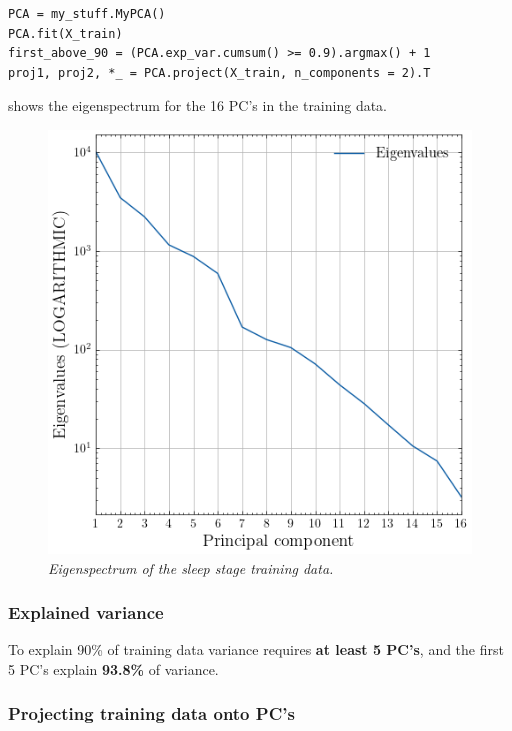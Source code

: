 \begin{verbatim}
PCA = my_stuff.MyPCA()
PCA.fit(X_train)
first_above_90 = (PCA.exp_var.cumsum() >= 0.9).argmax() + 1
proj1, proj2, *_ = PCA.project(X_train, n_components = 2).T
\end{verbatim}

 shows the eigenspectrum for the 16 PC's in the training
data.

\begin{figure}[H]
  \centering
  \includegraphics[width=\textwidth]{figures/q4_eigenspectrum.png}
  \vspace{-0.5cm}
  \caption{\footnotesize \textit{Eigenspectrum of the sleep stage training
  data.}}
  \label{fig:eigenspectrum}
\end{figure}

\subsubsection{Explained variance}

To explain 90\% of training data variance requires \textbf{at least 5 PC's}, and
the first 5 PC's explain \textbf{93.8\%} of variance.

\subsubsection{Projecting training data onto PC's}


